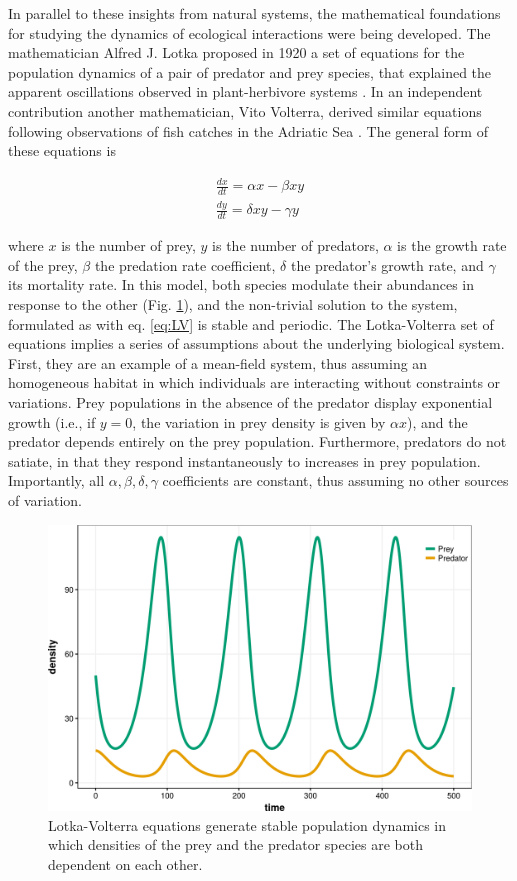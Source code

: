 In parallel to these insights from natural systems, the mathematical foundations for studying the dynamics of ecological interactions were being developed. The mathematician Alfred J. Lotka proposed in 1920 a set of equations for the population dynamics of a pair of predator and prey species, that explained the apparent oscillations observed in plant-herbivore systems \citep{Lotka1920}. In an independent contribution another mathematician, Vito Volterra, derived similar equations following observations of fish catches in the Adriatic Sea \citep{Volterra1928}. The general form of these equations is

\begin{equation}
\begin{array}{c}
\frac{dx}{dt} = \alpha x - \beta xy \\
\frac{dy}{dt} = \delta xy - \gamma y
\end{array}\label{eq:LV}
\end{equation}

where $x$ is the number of prey, $y$ is the number of predators, $\alpha$ is the growth rate of the prey, $\beta$ the predation rate coefficient, $\delta$ the predator's growth rate, and $\gamma$ its mortality rate. In this model, both species modulate their abundances in response to the other (Fig. \ref{fig:LV_example}), and the non-trivial solution to the system, formulated as with eq. \ref{eq:LV} is stable and periodic. The Lotka-Volterra set of equations implies a series of assumptions about the underlying biological system. First, they are an example of a mean-field system, thus assuming an homogeneous habitat in which individuals are interacting without constraints or variations. Prey populations in the absence of the predator display exponential growth (i.e., if $ y = 0$, the variation in prey density is given by $\alpha x$), and the predator depends entirely on the prey population. Furthermore, predators do not satiate, in that they respond instantaneously to increases in prey population. Importantly, all $\alpha , \beta , \delta , \gamma$ coefficients are constant, thus assuming no other sources of variation.

\begin{figure}[ht]
\centering
\includegraphics[width=.75\textwidth]{./Figures/intro/ecological_networks/LV_example.png}
\caption[2-species Lotka-Volterra system]{\color{Gray} Lotka-Volterra equations generate stable population dynamics in which densities of the prey and the predator species are both dependent on each other.}
\label{fig:LV_example}
\end{figure}

